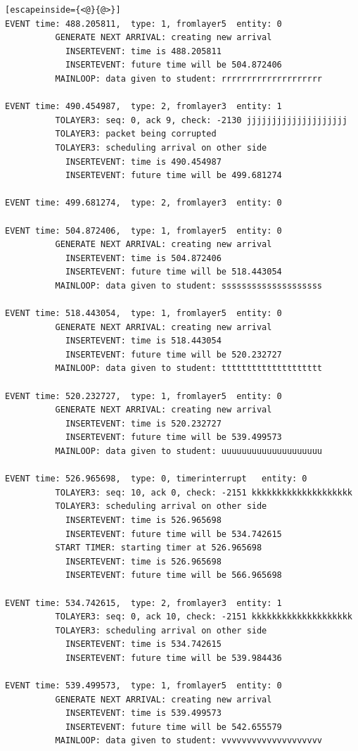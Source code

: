 \documentclass[paper=a4, fontsize=11pt]{scrartcl}
\numberwithin{equation}{section}		%
\numberwithin{figure}{section}			%
\numberwithin{table}{section}				%
\begin{document}
\begin{lstlisting}[escapeinside={<@}{@>}]
EVENT time: 488.205811,  type: 1, fromlayer5  entity: 0
          GENERATE NEXT ARRIVAL: creating new arrival
            INSERTEVENT: time is 488.205811
            INSERTEVENT: future time will be 504.872406
          MAINLOOP: data given to student: rrrrrrrrrrrrrrrrrrrr

EVENT time: 490.454987,  type: 2, fromlayer3  entity: 1
          TOLAYER3: seq: 0, ack 9, check: -2130 jjjjjjjjjjjjjjjjjjjj
          TOLAYER3: packet being corrupted
          TOLAYER3: scheduling arrival on other side
            INSERTEVENT: time is 490.454987
            INSERTEVENT: future time will be 499.681274

EVENT time: 499.681274,  type: 2, fromlayer3  entity: 0

EVENT time: 504.872406,  type: 1, fromlayer5  entity: 0
          GENERATE NEXT ARRIVAL: creating new arrival
            INSERTEVENT: time is 504.872406
            INSERTEVENT: future time will be 518.443054
          MAINLOOP: data given to student: ssssssssssssssssssss

EVENT time: 518.443054,  type: 1, fromlayer5  entity: 0
          GENERATE NEXT ARRIVAL: creating new arrival
            INSERTEVENT: time is 518.443054
            INSERTEVENT: future time will be 520.232727
          MAINLOOP: data given to student: tttttttttttttttttttt

EVENT time: 520.232727,  type: 1, fromlayer5  entity: 0
          GENERATE NEXT ARRIVAL: creating new arrival
            INSERTEVENT: time is 520.232727
            INSERTEVENT: future time will be 539.499573
          MAINLOOP: data given to student: uuuuuuuuuuuuuuuuuuuu

EVENT time: 526.965698,  type: 0, timerinterrupt   entity: 0
          TOLAYER3: seq: 10, ack 0, check: -2151 kkkkkkkkkkkkkkkkkkkk
          TOLAYER3: scheduling arrival on other side
            INSERTEVENT: time is 526.965698
            INSERTEVENT: future time will be 534.742615
          START TIMER: starting timer at 526.965698
            INSERTEVENT: time is 526.965698
            INSERTEVENT: future time will be 566.965698

EVENT time: 534.742615,  type: 2, fromlayer3  entity: 1
          TOLAYER3: seq: 0, ack 10, check: -2151 kkkkkkkkkkkkkkkkkkkk
          TOLAYER3: scheduling arrival on other side
            INSERTEVENT: time is 534.742615
            INSERTEVENT: future time will be 539.984436

EVENT time: 539.499573,  type: 1, fromlayer5  entity: 0
          GENERATE NEXT ARRIVAL: creating new arrival
            INSERTEVENT: time is 539.499573
            INSERTEVENT: future time will be 542.655579
          MAINLOOP: data given to student: vvvvvvvvvvvvvvvvvvvv


\end{lstlisting}
\end{document}
